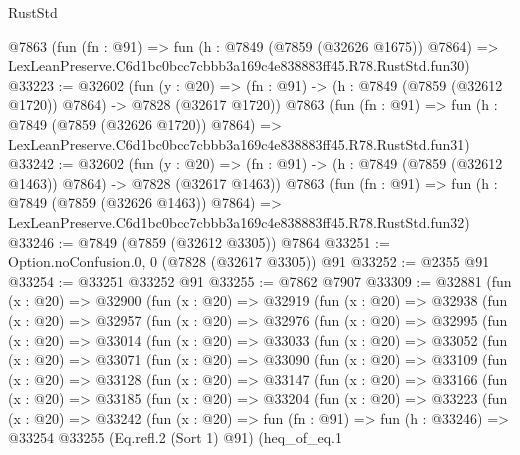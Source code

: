 \begin{lexlean}{RustStd}
\begin{coremodule}
    @7863
    (fun (fn : @91) =>
    fun (h : @7849 (@7859 (@32626 @1675)) @7864) =>
    LexLeanPreserve.C6d1bc0bcc7cbbb3a169c4e838883ff45.R78.RustStd.fun30)
@33223 := @32602
    (fun (y : @20) =>
    (fn : @91) -> (h : @7849 (@7859 (@32612 @1720)) @7864) -> @7828 (@32617 @1720))
    @7863
    (fun (fn : @91) =>
    fun (h : @7849 (@7859 (@32626 @1720)) @7864) =>
    LexLeanPreserve.C6d1bc0bcc7cbbb3a169c4e838883ff45.R78.RustStd.fun31)
@33242 := @32602
    (fun (y : @20) =>
    (fn : @91) -> (h : @7849 (@7859 (@32612 @1463)) @7864) -> @7828 (@32617 @1463))
    @7863
    (fun (fn : @91) =>
    fun (h : @7849 (@7859 (@32626 @1463)) @7864) =>
    LexLeanPreserve.C6d1bc0bcc7cbbb3a169c4e838883ff45.R78.RustStd.fun32)
@33246 := @7849 (@7859 (@32612 @3305)) @7864
@33251 := Option.noConfusion.{0, 0} (@7828 (@32617 @3305)) @91
@33252 := @2355 @91
@33254 := @33251 @33252 @91
@33255 := @7862 @7907
@33309 := @32881
    (fun (x : @20) =>
    @32900
      (fun (x : @20) =>
      @32919
        (fun (x : @20) =>
        @32938
          (fun (x : @20) =>
          @32957
            (fun (x : @20) =>
            @32976
              (fun (x : @20) =>
              @32995
                (fun (x : @20) =>
                @33014
                  (fun (x : @20) =>
                  @33033
                    (fun (x : @20) =>
                    @33052
                      (fun (x : @20) =>
                      @33071
                        (fun (x : @20) =>
                        @33090
                          (fun (x : @20) =>
                          @33109
                            (fun (x : @20) =>
                            @33128
                              (fun (x : @20) =>
                              @33147
                                (fun (x : @20) =>
                                @33166
                                  (fun (x : @20) =>
                                  @33185
                                    (fun (x : @20) =>
                                    @33204
                                      (fun (x : @20) =>
                                      @33223
                                        (fun (x : @20) =>
                                        @33242
                                          (fun (x : @20) =>
                                          fun (fn : @91) =>
                                          fun (h : @33246) =>
                                          @33254
                                            @33255
                                            (Eq.refl.{2} (Sort 1) @91)
                                            (heq_of_eq.{1}

\end{coremodule}
\end{lexlean}
